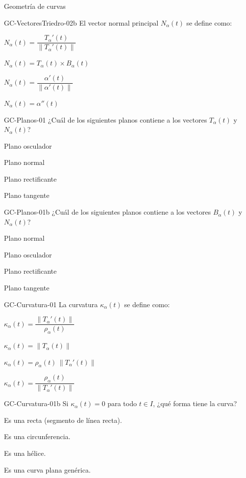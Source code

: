 \documentclass[a4,11pt]{aleph-notas}
\begin{document}
\begin{quiz}{Geometría de curvas}
\begin{multi}[]%
    {GC-VectoresTriedro-02b}
    El vector normal principal $N_\alpha(t)$ se define como:
    \item* $N_\alpha(t)=\dfrac{T_\alpha'(t)}{\|T_\alpha'(t)\|}$
    \item $N_\alpha(t)=T_\alpha(t)\times B_\alpha(t)$
    \item $N_\alpha(t)=\dfrac{\alpha'(t)}{\|\alpha'(t)\|}$
    \item $N_\alpha(t)=\alpha''(t)$
\end{multi}

\begin{multi}[]%
    {GC-Planos-01}
    ¿Cuál de los siguientes planos contiene a los vectores $T_\alpha(t)$ y $N_\alpha(t)$?
    \item* Plano osculador
    \item Plano normal
    \item Plano rectificante
    \item Plano tangente
\end{multi}

\begin{multi}[]%
    {GC-Planos-01b}
    ¿Cuál de los siguientes planos contiene a los vectores $B_\alpha(t)$ y $N_\alpha(t)$?
    \item* Plano normal
    \item Plano osculador
    \item Plano rectificante
    \item Plano tangente
\end{multi}

\begin{multi}[]%
    {GC-Curvatura-01}
    La curvatura $\kappa_\alpha(t)$ se define como:
    \item* $\kappa_\alpha(t)=\dfrac{\|T_\alpha'(t)\|}{\rho_\alpha(t)}$
    \item $\kappa_\alpha(t)=\|T_\alpha(t)\|$
    \item $\kappa_\alpha(t)=\rho_\alpha(t)\,\|T_\alpha'(t)\|$
    \item $\kappa_\alpha(t)=\dfrac{\rho_\alpha(t)}{\|T_\alpha'(t)\|}$
\end{multi}

\begin{multi}[]%
    {GC-Curvatura-01b}
    Si $\kappa_\alpha(t)=0$ para todo $t\in I$, ¿qué forma tiene la curva?
    \item* Es una recta (segmento de línea recta).
    \item Es una circunferencia.
    \item Es una hélice.
    \item Es una curva plana genérica.
\end{multi}


\end{quiz}
\end{document}
